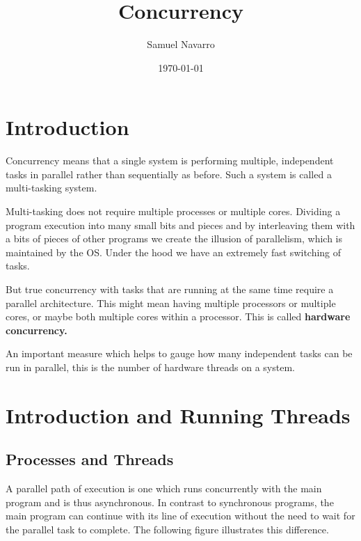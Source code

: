 \documentclass[11pt, a4paper]{article}
\begin{document}
\title{Concurrency}
\author{Samuel Navarro}
\date{\today}
\maketitle
\tableofcontents{}

\section{Introduction}%
\label{sec:introduction}

Concurrency means that a single system is performing multiple, independent tasks in parallel rather than sequentially as before. Such a system is called a multi-tasking system. 

Multi-tasking does not require multiple processes or multiple cores. Dividing a program execution into many small bits and pieces and by interleaving them with a bits of pieces of other programs we create the illusion of parallelism, which is maintained by the OS. Under the hood we have an extremely fast switching of tasks. 

But true concurrency with tasks that are running at the same time require a parallel architecture. This might mean having multiple processors or multiple cores, or maybe both multiple cores within a processor. This is called \textbf{hardware concurrency.}


An important measure which helps to gauge how many independent tasks can be run in parallel, this is the number of hardware threads on a system. 


\section{Introduction and Running Threads}%
\label{sec:introduction_and_running_threads}



\subsection{Processes and Threads}%
\label{sec:processes_and_threads}



A parallel path of execution is one which runs concurrently with the main program and is thus asynchronous. In contrast to synchronous programs, the main program can continue with its line of execution without the need to wait for the parallel task to complete. The following figure illustrates this difference.
\end{document}
